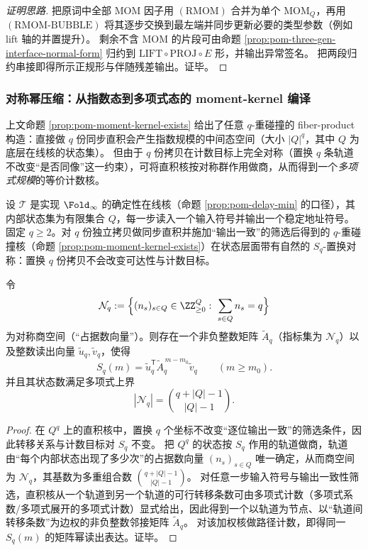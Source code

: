 \begin{proof}[证明思路]
把原词中全部 \(\mathrm{MOM}\) 因子用 \((\mathrm{RMOM})\) 合并为单个 \(\mathrm{MOM}_Q\)，再用 \((\mathrm{RMOM\text{-}BUBBLE})\) 将其逐步交换到最左端并同步更新必要的类型参数（例如 lift 轴的并置提升）。
剩余不含 \(\mathrm{MOM}\) 的片段可由命题 \ref{prop:pom-three-gen-interface-normal-form} 归约到 \(\mathrm{LIFT}\circ\mathrm{PROJ}\circ E\) 形，并输出异常签名。
把两段归约串接即得所示正规形与伴随残差输出。证毕。
\end{proof}

\subsubsection{对称幂压缩：从指数态到多项式态的 moment-kernel 编译}\label{subsec:pom-moment-symmetric-power}

上文命题 \ref{prop:pom-moment-kernel-exists} 给出了任意 \(q\)-重碰撞的 fiber-product 构造：直接做 \(q\) 份同步直积会产生指数规模的中间态空间（大小 \(|Q|^q\)，其中 \(Q\) 为底层在线核的状态集）。
但由于 \(q\) 份拷贝在计数目标上完全对称（置换 \(q\) 条轨道不改变“是否同像”这一约束），可将直积核按对称群作用做商，从而得到一个\emph{多项式规模}的等价计数核。

\begin{proposition}\label{prop:pom-moment-symmetric-power}
设 \(\mathcal{T}\) 是实现 \(\Fold_\infty\) 的确定性在线核（命题 \ref{prop:pom-delay-min} 的口径），其内部状态集为有限集合 \(Q\)，每一步读入一个输入符号并输出一个稳定地址符号。
固定 \(q\ge 2\)。对 \(q\) 份独立拷贝做同步直积并施加“输出一致”的筛选后得到的 \(q\)-重碰撞核（命题 \ref{prop:pom-moment-kernel-exists}）在状态层面带有自然的 \(S_q\)-置换对称：置换 \(q\) 份拷贝不会改变可达性与计数目标。

令
$$
\mathcal{N}_{q}:=\Bigl\{(n_s)_{s\in Q}\in\ZZ_{\ge 0}^{Q}:\ \sum_{s\in Q}n_s=q\Bigr\}
$$
为对称商空间（“占据数向量”）。则存在一个非负整数矩阵 \(\widetilde A_q\)（指标集为 \(\mathcal{N}_q\)）以及整数读出向量 \(\widetilde u_q,\widetilde v_q\)，使得
$$
S_q(m)=\widetilde u_q^{\mathsf T}\widetilde A_q^{\,m-m_0}\widetilde v_q\qquad(m\ge m_0).
$$
并且其状态数满足多项式上界
$$
|\mathcal{N}_q|=\binom{q+|Q|-1}{|Q|-1}.
$$
\end{proposition}

\begin{proof}
在 \(Q^q\) 上的直积核中，置换 \(q\) 个坐标不改变“逐位输出一致”的筛选条件，因此转移关系与计数目标对 \(S_q\) 不变。
把 \(Q^q\) 的状态按 \(S_q\) 作用的轨道做商，轨道由“每个内部状态出现了多少次”的占据数向量 \((n_s)_{s\in Q}\) 唯一确定，从而商空间为 \(\mathcal{N}_q\)，其基数为多重组合数 \(\binom{q+|Q|-1}{|Q|-1}\)。
对任意一步输入符号与输出一致性筛选，直积核从一个轨道到另一个轨道的可行转移条数可由多项式计数（多项式系数/多项式展开的多项式计数）显式给出，因此得到一个以轨道为节点、以“轨道间转移条数”为边权的非负整数邻接矩阵 \(\widetilde A_q\)。
对该加权核做路径计数，即得同一 \(S_q(m)\) 的矩阵幂读出表达。证毕。
\end{proof}

